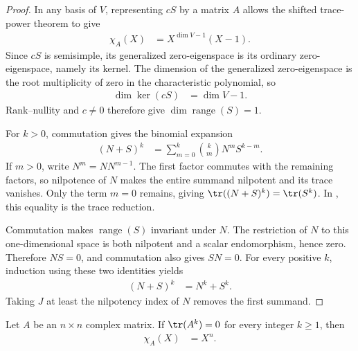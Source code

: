 \begin{proof}\leanok
    In any basis of $V$, representing $cS$ by a matrix $A$ allows
    the shifted trace-power theorem to give
    \begin{align}
        \chi_A(X) & =X^{\dim V-1}(X-1).
    \end{align}
    Since $cS$ is semisimple, its generalized zero-eigenspace is its ordinary
    zero-eigenspace, namely its kernel. The dimension of the generalized
    zero-eigenspace is the root multiplicity of zero in the characteristic
    polynomial, so
    \begin{align}
        \dim\ker(cS) & =\dim V-1.
    \end{align}
    Rank--nullity and $c\ne0$ therefore give
    $\dim\operatorname{range}(S)=1$.

    For $k>0$, commutation gives the binomial expansion
    \begin{align}
        (N+S)^k & =\sum_{m=0}^k \binom{k}{m}N^mS^{k-m}.
    \end{align}
    If $m>0$, write $N^m=N N^{m-1}$. The first factor commutes with the
    remaining factors, so nilpotence of $N$ makes the entire summand
    nilpotent and its trace vanishes. Only the term $m=0$ remains, giving
    $\tr((N+S)^k)=\tr(S^k)$. In \cite[Proposition~20, line~3865]{Molnar2018SemiInjective}, this equality is the trace
    reduction.

    Commutation makes $\operatorname{range}(S)$ invariant under $N$. The
    restriction of $N$ to this one-dimensional space is both nilpotent and a
    scalar endomorphism, hence zero. Therefore $NS=0$, and commutation also
    gives $SN=0$. For every positive $k$, induction using these two identities
    yields
    \begin{align}
        (N+S)^k & =N^k+S^k.
    \end{align}
    Taking $J$ at least the nilpotency index of $N$ removes the first summand.
\end{proof}

\begin{lemma}
    \label{thm:mpu_zero_trace_power_charpoly}
    \leanok
    Let $A$ be an $n\times n$ complex matrix. If $\tr(A^k)=0$ for every integer
    $k\geq1$, then
    \begin{align}
        \chi_A(X) & =X^n.
    \end{align}
\end{lemma}

